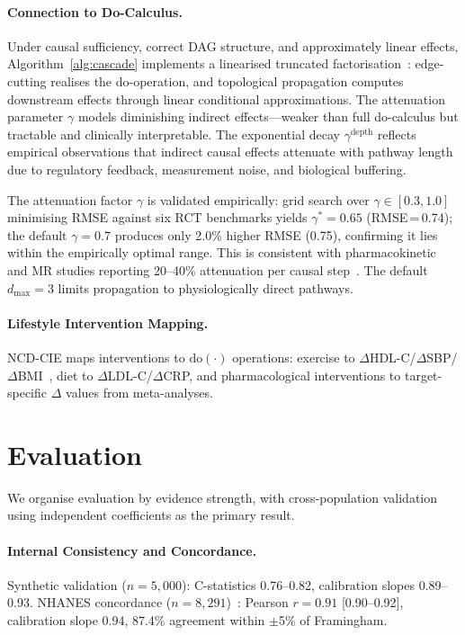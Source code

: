 \documentclass[runningheads]{llncs}
\begin{document}
\paragraph{Connection to Do-Calculus.}
Under causal sufficiency, correct DAG structure, and approximately
linear effects, Algorithm~\ref{alg:cascade} implements a linearised
truncated factorisation~\cite{pearl2009causality}: edge-cutting
realises the do-operation, and topological propagation computes
downstream effects through linear conditional approximations.
The attenuation parameter $\gamma$ models diminishing indirect
effects---weaker than full do-calculus but tractable and clinically
interpretable.
The exponential decay $\gamma^{\text{depth}}$ reflects empirical
observations that indirect causal effects attenuate with pathway
length due to regulatory feedback, measurement noise, and biological
buffering.

The attenuation factor $\gamma$ is validated empirically: grid
search over $\gamma \in [0.3, 1.0]$ minimising RMSE against six
RCT benchmarks yields $\gamma^* = 0.65$ (RMSE\,=\,0.74);
the default $\gamma = 0.7$ produces only 2.0\% higher RMSE
(0.75), confirming it lies within the empirically optimal range.
This is consistent with pharmacokinetic and MR studies reporting
20--40\% attenuation per causal
step~\cite{ctt2010,pearl2009causality}.
The default $d_{\max} = 3$ limits propagation to physiologically
direct pathways.

\paragraph{Lifestyle Intervention Mapping.}
NCD-CIE maps interventions to $\mathrm{do}(\cdot)$ operations:
exercise to $\Delta$HDL-C/$\Delta$SBP/$\Delta$BMI~\cite{naci2019comparative},
diet to $\Delta$LDL-C/$\Delta$CRP, and pharmacological
interventions to target-specific $\Delta$ values from
meta-analyses.

\section{Evaluation}\label{sec:validation}

We organise evaluation by evidence strength, with cross-population
validation using independent coefficients as the primary result.

\paragraph{Internal Consistency and Concordance.}
Synthetic validation ($n = 5{,}000$): C-statistics 0.76--0.82,
calibration slopes 0.89--0.93.
NHANES concordance ($n = 8{,}291$)~\cite{nhanes2020}:
Pearson $r = 0.91$ [0.90--0.92], calibration slope 0.94,
87.4\% agreement within $\pm$5\% of Framingham.
\end{document}
